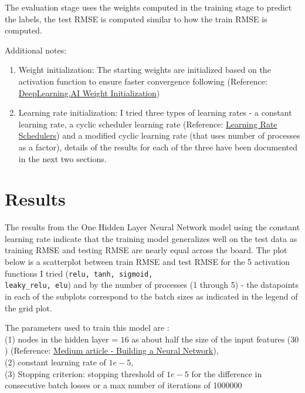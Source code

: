 \documentclass{article}
\begin{document}
The evaluation stage uses the weights computed in the training stage to predict the labels, the test RMSE is computed similar to how the train RMSE is computed. 

Additional notes:

\begin{enumerate}
    \item Weight initialization: The starting weights are initialized based on the activation function to ensure faster
    convergence following (Reference: \\ \href{https://www.deeplearning.ai/ai-notes/initialization/index.html}{DeepLearning.AI Weight Initialization})
    \item Learning rate initialization: I tried three types of learning rates - a constant learning rate, a cyclic scheduler learning rate (Reference: \href{https://machinelearningmastery.com/a-gentle-introduction-to-learning-rate-schedulers/}{Learning Rate Schedulers}) and a modified cyclic learning rate (that uses number of processes as a factor), details of the results for each of the three have been documented in the next two sections.
\end{enumerate}

\section{Results}
The results from the One Hidden Layer Neural Network model using the constant learning rate indicate that the training model generalizes well on the test data as training RMSE and testing RMSE are nearly equal across the board. The plot below is a scatterplot between train RMSE and test RMSE for the 5 activation functions I tried (\verb|relu, tanh, sigmoid,| \\ \verb|leaky_relu, elu|) and by the number of processes (1 through 5) - the datapoints in each of the subplots correspond to the batch sizes as indicated in the legend of the grid plot.

The parameters used to train this model are : \\
(1) nodes in the hidden layer = $16$ as about half the size of the input features ($30$) (Reference: \href{https://medium.com/data-science/17-rules-of-thumb-for-building-a-neural-network-93356f9930af}{Medium article - Building a Neural Network}), \\
(2) constant learning rate of $1e-5$, \\
(3) Stopping criterion: stopping threshold of $1e-5$ for the difference in consecutive batch losses or a max number of iterations of 1000000 \\
\end{document}
